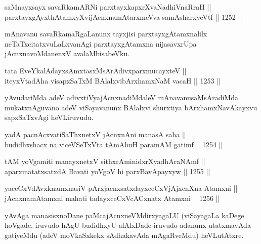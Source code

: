 
\begin{shl}
saMnayxsayx savaRkamARNi parxtayxkapxrXvaNadhiVnaRraH || \\
parxtayxgAyxthAtamxyXvijAcnxnamAtarxmeVva samAsharxyeVtf \hfill || 1252 ||  
\end{shl}

\begin{artha}
mAnavanu savaRkamaRgaLanunx tayxjisi parxtayxgAtamxnalilx neTaTxcitatxvuLaLxvanAgi parxtayxgAtamxna nijasavxrUpa jAcnxnavoMdanenxV avalaMbisabeVku.
\end{artha}

\begin{shl}
tata EveYkalAdayxsAmxtasxMsArAdivxparxmucayxteV || \\
iteyxVtadAha visapxSaTxM BAlalxvibArxhamxNaM vacaH \hfill || 1253 ||  
\end{shl}

\begin{artha}
yAvudariMda adeV adivxtiVyajAcnxnadiMdaleV mAnavanu\break saMsAradiMda mukatxnAguvano adeV viSayavanunx BAlalxvi shurxtiya bArxhamxNavAkayxvu sapxSaTxvAgi heVLiruvudu.
\end{artha}


\begin{shl}
yadA pacnAcxvatiSaThxnetxV jAcnxnAni manasA saha || \\
budidhxshacx na viceVSeTxVta tAmAhuH paramAM gatimf \hfill || 1254 ||  
\end{shl}
				
\begin{shl}
tAM yoVgamiti manayxnetxV sithxrAminidxrXyadhAraNAmf || \\
aparxmatatxsatxdA Bavati yoVgoV hi parxBavApayxyw \hfill || 1255 ||  
\end{shl}

\begin{shl}
yaceCxVdAvxknamxnasiV pArxjacnxsatxdayxceCxVjAjxcnXna Atamxni || \\
jAcnxnamAtamxni mahati tadayxceCxVcACxnatx Atamxni \hfill || 1256 ||  
\end{shl}

\begin{artha}
yAvAga manasisxnoDane paMcajAcnxneVMdirxyagaLU (viSayagaLa kaDege hoVgade, iruvudo hAgU budidhxyU alAlxDade iruvudo adanunx utatxmavAda gatiyeMdu (adeV moVkaSxkekx sAdhakavAda mAgaRveMdu) heVLutAtxre.
\end{artha}

